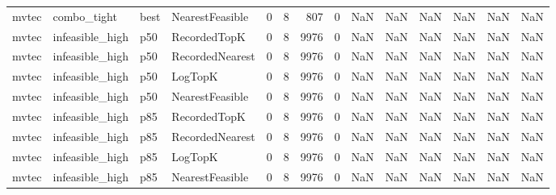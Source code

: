 \begin{tabular}{llllrrrrrrrrrr}
   mvtec &          combo\_tight &   best & NearestFeasible &           0 &          8 &            807 &                   0 &            NaN &             NaN &                       NaN &            NaN &                    NaN &                     NaN \\
   mvtec &      infeasible\_high &    p50 &    RecordedTopK &           0 &          8 &           9976 &                   0 &            NaN &             NaN &                       NaN &            NaN &                    NaN &                     NaN \\
   mvtec &      infeasible\_high &    p50 & RecordedNearest &           0 &          8 &           9976 &                   0 &            NaN &             NaN &                       NaN &            NaN &                    NaN &                     NaN \\
   mvtec &      infeasible\_high &    p50 &         LogTopK &           0 &          8 &           9976 &                   0 &            NaN &             NaN &                       NaN &            NaN &                    NaN &                     NaN \\
   mvtec &      infeasible\_high &    p50 & NearestFeasible &           0 &          8 &           9976 &                   0 &            NaN &             NaN &                       NaN &            NaN &                    NaN &                     NaN \\
   mvtec &      infeasible\_high &    p85 &    RecordedTopK &           0 &          8 &           9976 &                   0 &            NaN &             NaN &                       NaN &            NaN &                    NaN &                     NaN \\
   mvtec &      infeasible\_high &    p85 & RecordedNearest &           0 &          8 &           9976 &                   0 &            NaN &             NaN &                       NaN &            NaN &                    NaN &                     NaN \\
   mvtec &      infeasible\_high &    p85 &         LogTopK &           0 &          8 &           9976 &                   0 &            NaN &             NaN &                       NaN &            NaN &                    NaN &                     NaN \\
   mvtec &      infeasible\_high &    p85 & NearestFeasible &           0 &          8 &           9976 &                   0 &            NaN &             NaN &                       NaN &            NaN &                    NaN &                     NaN \\

\end{tabular}
